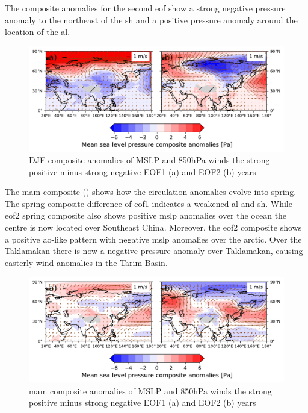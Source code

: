 The composite anomalies for the second \acrshort{eof} show a strong negative pressure anomaly to the northeast of the \acrshort{sh} and a positive pressure anomaly around the location of the \acrshort{al}. 
\begin{figure}[htpb]
    \centering
    \includegraphics[width=\textwidth]{texfiles/figs/EOF_emissions_composite.pdf}
    \caption{DJF composite anomalies of MSLP and 850hPa winds the strong positive minus strong negative  EOF1 (a) and EOF2 (b) years}
    \label{fig:eof_composite_DJF}
\end{figure}
The \acrshort{mam} composite () shows how the circulation anomalies evolve into spring. 
The spring composite difference of \acrshort{eof}1 indicates a weakened \acrshort{al} and \acrshort{sh}. 
While \acrshort{eof}2 spring composite also shows positive \acrshort{mslp} anomalies over the ocean the centre is now located over Southeast China. Moreover, the \acrshort{eof}2 composite shows a positive \acrshort{ao}-like pattern with negative \acrshort{mslp} anomalies over the arctic. 
Over the Taklamakan there is now a negative pressure anomaly over Taklamakan, causing easterly wind anomalies in the Tarim Basin.
\begin{figure}[htpb]
    \centering
    \includegraphics[width=\textwidth]{texfiles/figs/EOF_emissions_composite_MAM.pdf}
    \caption{\acrshort{mam} composite anomalies of MSLP and 850hPa winds the strong positive minus strong negative  EOF1 (a) and EOF2 (b) years}
    \label{fig:eof_composite_MAM}
\end{figure}

